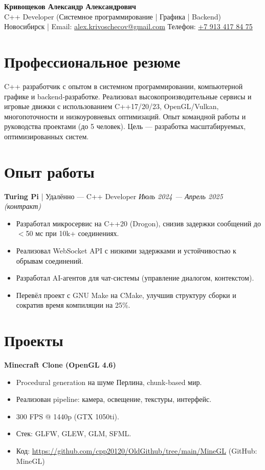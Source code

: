 \documentclass[a4paper,10pt]{article}
\begin{document}
\begin{center}
    {\LARGE \textbf{Кривощеков Александр Александрович}}\\
    \small C++ Developer (Системное программирование | Графика | Backend)\\
    Новосибирск | Email: \href{mailto:alex.krivoschecov@gmail.com}{alex.krivoschecov@gmail.com}  
Телефон: \href{tel:+79134178475}{+7 913 417 84 75}  
\end{center}

\section*{Профессиональное резюме}
C++ разработчик с опытом в системном программировании, компьютерной графике и backend-разработке.  
Реализовал высокопроизводительные сервисы и игровые движки с использованием C++17/20/23, OpenGL/Vulkan, многопоточности и низкоуровневых оптимизаций.  
Опыт командной работы и руководства проектами (до 5 человек).  
Цель — разработка масштабируемых, оптимизированных систем.

\section*{Опыт работы}

\textbf{Turing Pi} | Удалённо — C++ Developer  
\textit{Июль 2024 — Апрель 2025 (контракт)}  
\begin{itemize}[noitemsep]
    \item Разработал микросервис на C++20 (Drogon), снизив задержки сообщений до $<$50 мс при 10k+ соединениях.
    \item Реализовал WebSocket API с низкими задержками и устойчивостью к обрывам соединений.
    \item Разработал AI-агентов для чат-системы (управление диалогом, контекстом).
    \item Перевёл проект с GNU Make на CMake, улучшив структуру сборки и сократив время компиляции на 25\%.
\end{itemize}

\section*{Проекты}

\textbf{Minecraft Clone (OpenGL 4.6)}  
\begin{itemize}[noitemsep]  
    \item Procedural generation на шуме Перлина, chunk-based мир.  
    \item Реализован pipeline: камера, освещение, текстуры, интерфейс.  
    \item 300 FPS @ 1440p (GTX 1050ti).  
    \item Стек: GLFW, GLEW, GLM, SFML.  
    \item Код: \url{https://github.com/cpp20120/OldGithub/tree/main/MineGL}  
    (GitHub: MineGL)  
\end{itemize}  
\end{document}
